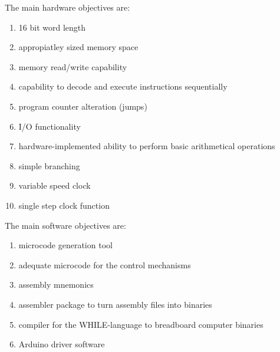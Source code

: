 \documentclass[11pt]{informatics-report}
\begin{document}
The main hardware  objectives are:
\begin{enumerate}
  \item 16 bit word length
  \item appropiatley sized memory space
  \item memory read/write capability
  \item capability to decode and execute instructions sequentially
  \item program counter alteration (jumps)
  \item I/O functionality
  \item hardware-implemented ability to perform basic arithmetical operations \label{aritm}
  \item simple branching
  \item variable speed clock
  \item single step clock function
\end{enumerate}
\pagebreak
The main software objectives are:
\begin{enumerate}
  \item microcode generation tool
  \item adequate microcode for the control mechanisms
  \item assembly mnemonics
  \item assembler package to turn assembly files into binaries
  \item compiler for the WHILE-language to breadboard computer binaries
  \item Arduino driver software
\end{enumerate}
\end{document}
